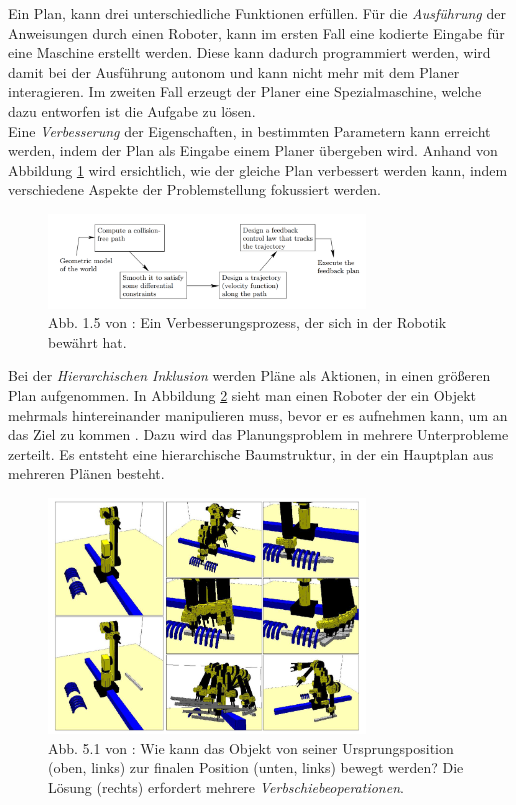Ein Plan, kann drei unterschiedliche Funktionen erfüllen.
Für die \textit{Ausführung} der Anweisungen durch einen Roboter, kann im ersten Fall eine kodierte Eingabe für eine Maschine erstellt werden. 
Diese kann dadurch programmiert werden, wird damit bei der Ausführung autonom und kann nicht mehr mit dem Planer interagieren.
Im zweiten Fall erzeugt der Planer eine Spezialmaschine, welche dazu entworfen ist die Aufgabe zu lösen.\cite[~S. 21]{Lav06}\newline\\
Eine \textit{Verbesserung} der Eigenschaften, in bestimmten Parametern kann erreicht werden, indem der Plan als Eingabe einem Planer übergeben wird. Anhand von Abbildung \ref{lav02} wird ersichtlich, wie der gleiche Plan verbessert werden kann, indem verschiedene Aspekte der Problemstellung fokussiert werden.\cite[~S. 22]{Lav06}

\begin{figure}
	\centering
	\includegraphics[width=0.75\textwidth]{images/img247.png}
	\caption{Abb. 1.5 von \cite[~S. 20]{Lav06}:  Ein Verbesserungsprozess, der sich in der Robotik bewährt hat.}
	\label{lav02}
\end{figure}

Bei der \textit{Hierarchischen Inklusion} werden Pläne als Aktionen, in einen größeren Plan aufgenommen. In Abbildung \ref{cortes01} sieht man einen Roboter der ein Objekt mehrmals hintereinander manipulieren muss, bevor er es aufnehmen kann, um an das Ziel zu kommen \cite{cortes:03}. Dazu wird das Planungsproblem in mehrere Unterprobleme zerteilt. Es entsteht eine hierarchische Baumstruktur, in der ein Hauptplan aus mehreren Plänen besteht\cite[~S. 23]{Lav06}.

\begin{figure}
	\centering
	\includegraphics[width=0.75\textwidth]{images/hierarchical.png}
	\caption{Abb. 5.1 von \cite{cortes:03}: Wie kann das Objekt von seiner Ursprungsposition (oben, links) zur finalen Position (unten, links) bewegt werden? Die Lösung (rechts) erfordert mehrere \textit{Verbschiebeoperationen}.}
	\label{cortes01}
\end{figure}

